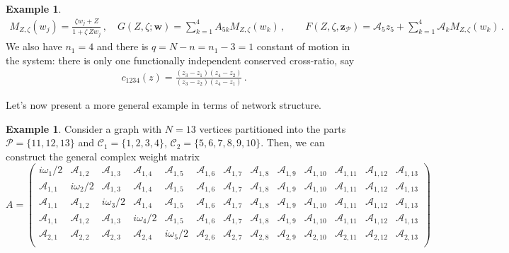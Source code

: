 \documentclass[aps,pre,reprint,longbibliography,superscriptaddress,noshowpacs,floatfix]{revtex4-2}
\theoremstyle{definition}
\newtheorem{example}[theorem]{Example}
\theoremstyle{remark}
\begin{document}
\begin{example}
\begin{align*}
    M_{Z, \zeta }(w_j) = \frac{\zeta w_j + Z}{1 + \zeta\,\overline{Z} w_j}\,,\quad G(Z, \zeta;\bm{w}) = \sum_{k=1}^4 A_{5 k}M_{Z, \zeta}(w_k)\,,\qquad
    F(Z, \zeta, \bm{z}_{\mathcal{P}}) = \mathcal{A}_{5}z_5 + \sum_{k=1}^4 \mathcal{A}_{k}M_{Z, \zeta}(w_k)\,.
\end{align*}
We also have $n_1 = 4$ and there is $q = N - n = n_1 - 3 = 1$ constant of motion in the system: there is only one functionally independent conserved cross-ratio, say
\begin{align*}
    c_{1234}(z) = \frac{(z_{3}-z_{1})(z_{4}-z_{2})}{(z_{3}-z_{2})(z_{4}-z_{1})}\,.
\end{align*}
\end{example}
Let's now present a more general example in terms of network structure.
\begin{example}
    Consider a graph with $N = 13$ vertices partitioned into the parts $\mathcal{P} = \{11, 12, 13\}$ and $\mathcal{C}_1 = \{1,2,3,4\}$, $\mathcal{C}_2 = \{5,6,7,8,9,10\}$. Then, we can construct the general complex weight matrix
    \begin{equation*}
        A = \begin{pmatrix}
        i\omega_1/2 & \mathcal{A}_{1,2} & \mathcal{A}_{1,3} & \mathcal{A}_{1,4} & \mathcal{A}_{1,5} & \mathcal{A}_{1,6}& \mathcal{A}_{1,7} & \mathcal{A}_{1,8}& \mathcal{A}_{1,9} & \mathcal{A}_{1,10} & \mathcal{A}_{1,11} & \mathcal{A}_{1,12} & \mathcal{A}_{1,13}\\
        \mathcal{A}_{1,1} & i\omega_2/2 & \mathcal{A}_{1,3} & \mathcal{A}_{1,4} & \mathcal{A}_{1,5} & \mathcal{A}_{1,6}& \mathcal{A}_{1,7} & \mathcal{A}_{1,8}& \mathcal{A}_{1,9} & \mathcal{A}_{1,10} & \mathcal{A}_{1,11} & \mathcal{A}_{1,12} & \mathcal{A}_{1,13}\\
        \mathcal{A}_{1,1} & \mathcal{A}_{1,2} & i\omega_3/2 & \mathcal{A}_{1,4} & \mathcal{A}_{1,5} & \mathcal{A}_{1,6}& \mathcal{A}_{1,7} & \mathcal{A}_{1,8}& \mathcal{A}_{1,9} & \mathcal{A}_{1,10} & \mathcal{A}_{1,11} & \mathcal{A}_{1,12} & \mathcal{A}_{1,13}\\
        \mathcal{A}_{1,1} & \mathcal{A}_{1,2} & \mathcal{A}_{1,3} & i\omega_4/2 & \mathcal{A}_{1,5} & \mathcal{A}_{1,6}& \mathcal{A}_{1,7} & \mathcal{A}_{1,8}& \mathcal{A}_{1,9} & \mathcal{A}_{1,10} & \mathcal{A}_{1,11} & \mathcal{A}_{1,12} & \mathcal{A}_{1,13}\\
        \hline 
        \mathcal{A}_{2,1} & \mathcal{A}_{2,2} & \mathcal{A}_{2,3} & \mathcal{A}_{2,4} & i\omega_5/2 & \mathcal{A}_{2,6}& \mathcal{A}_{2,7} & \mathcal{A}_{2,8}& \mathcal{A}_{2,9} & \mathcal{A}_{2,10} & \mathcal{A}_{2,11} & \mathcal{A}_{2,12} & \mathcal{A}_{2,13}\\

\end{pmatrix}
\end{equation*}
\end{example}
\end{document}
